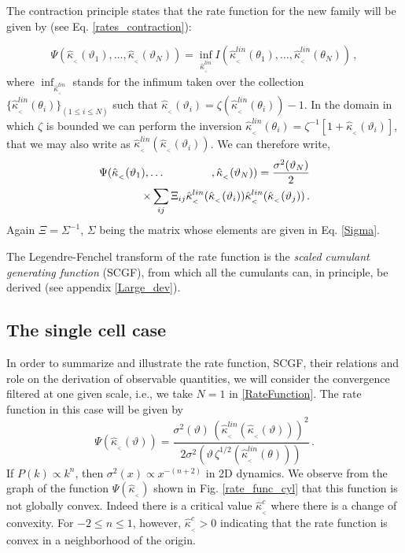 \documentclass[twocolumn,aps,reprint, nofootinbib]{revtex4}
\newcommand{\hkappa}{\hat{\kappa}_{_<}}
\begin{document}
The contraction principle states that the rate function for the new family will be given by (see Eq. \eqref{rates_contraction}):

\begin{equation}
\Psi(\hkappa(\vartheta_1), \ldots, \hkappa(\vartheta_N)) = \inf_{\hkappa^{lin}} I(\hkappa^{lin}(\theta_1), \ldots, \hkappa^{lin}(\theta_N)) \, ,
\end{equation}
where $\inf_{\hkappa^{lin}}$ stands for the infimum taken over the collection $\{\hkappa^{lin}(\theta_i)\}_{(1 \leq i \leq N)}$ such that $\hkappa(\vartheta_i) = \zeta( \hkappa^{lin}(\theta_i) )-1$. In the domain in which $\zeta$ is bounded we can perform the inversion $\hkappa^{lin}(\theta_i) = \zeta^{-1}[1+\hkappa(\vartheta_i)]$, that we may also write as $\hkappa^{lin} ( \hkappa(\vartheta_i))$. We can therefore write,
\begin{eqnarray}
\label{RateFunction}
\Psi(\hkappa(\vartheta_1), & \ldots &, \hkappa(\vartheta_N)) = \frac{\sigma^2(\vartheta_N)}{2} \nonumber\\ & & \hspace{-1cm}\times \sum_{i j} \Xi_{i j} \hkappa^{lin} ( \hkappa (\vartheta_i)) \hkappa^{lin} ( \hkappa (\vartheta_j)) \, .
\end{eqnarray}
Again $\Xi = \Sigma^{-1}$, $\Sigma$ being the matrix whose elements are given in Eq. \eqref{Sigma}. 

The Legendre-Fenchel transform of the rate function is the \emph{scaled cumulant generating function} (SCGF), from which all the cumulants can, in principle, be derived (see appendix \ref{Large_dev}).

\subsection{The single cell case}

In order to summarize and illustrate the rate function, SCGF, their relations and role on the derivation of observable quantities, we will consider the convergence filtered at one given scale, i.e., we take $N=1$ in \eqref{RateFunction}. The rate function in this case will be given by
\begin{equation}
\label{rate_function_n1}
\Psi(\hkappa(\vartheta)) = \frac{\sigma^2( \vartheta) \, (\hkappa^{lin}(\hkappa(\vartheta)))^2}{2 \sigma^2( \vartheta \, \zeta^{1/2}(\hkappa^{lin}(\theta)))} \, .
\end{equation}
If $P(k) \propto k^n$, then $\sigma^2(x) \propto x^{-(n+2)}$ in 2D dynamics. We observe from the graph of the function $\Psi(\hkappa)$ shown in Fig. \ref{rate_func_cyl} that this function is not globally convex. Indeed there is a critical value $\hkappa^c$ where there is a change of convexity. For $-2 \leq n \leq 1$, however, $\hkappa^c > 0$ indicating that the rate function is convex in a neighborhood of the origin.
\end{document}
